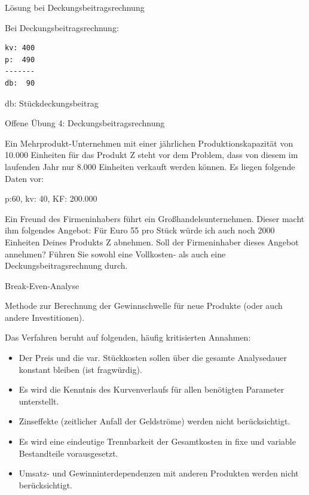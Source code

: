 \documentclass[12pt,ngerman,a4paper,ignorenonframetext,]{beamer}
\providecommand{\tightlist}{%
  \setlength{\itemsep}{0pt}\setlength{\parskip}{0pt}}
\begin{document}
\begin{frame}[fragile]{Lösung bei Deckungsbeitragsrechnung}
\protect\hypertarget{losung-bei-deckungsbeitragsrechnung}{}

Bei Deckungsbeitragsrechnung:

\begin{verbatim}
kv: 400  
p:  490  
-------  
db:  90  
\end{verbatim}

db: Stückdeckungsbeitrag

\end{frame}

\begin{frame}{Offene Übung 4: Deckungsbeitragsrechnung}
\protect\hypertarget{offene-ubung-4-deckungsbeitragsrechnung}{}

Ein Mehrprodukt-Unternehmen mit einer jährlichen Produktionskapazität
von 10.000 Einheiten für das Produkt Z steht vor dem Problem, dass von
diesem im laufenden Jahr nur 8.000 Einheiten verkauft werden können. Es
liegen folgende Daten vor:

p:60, kv: 40, KF: 200.000

Ein Freund des Firmeninhabers führt ein Großhandelsunternehmen. Dieser
macht ihm folgendes Angebot: Für Euro 55 pro Stück würde ich auch noch
2000 Einheiten Deines Produkts Z abnehmen. Soll der Firmeninhaber dieses
Angebot annehmen? Führen Sie sowohl eine Vollkosten- als auch eine
Deckungsbeitragsrechnung durch.


\end{frame}

\begin{frame}{Break-Even-Analyse}
\protect\hypertarget{break-even-analyse}{}

Methode zur Berechnung der Gewinnschwelle für neue Produkte (oder auch
andere Investitionen).

Das Verfahren beruht auf folgenden, häufig kritisierten Annahmen:

\begin{itemize}
\tightlist
\item
  Der Preis und die var. Stückkosten sollen über die gesamte
  Analysedauer konstant bleiben (ist fragwürdig).
\item
  Es wird die Kenntnis des Kurvenverlaufs für allen benötigten Parameter
  unterstellt.
\item
  Zinseffekte (zeitlicher Anfall der Geldströme) werden nicht
  berücksichtigt.
\item
  Es wird eine eindeutige Trennbarkeit der Gesamtkosten in fixe und
  variable Bestandteile vorausgesetzt.
\item
  Umsatz- und Gewinninterdependenzen mit anderen Produkten werden nicht
  berücksichtigt.
\end{itemize}

\end{frame}
\end{document}
